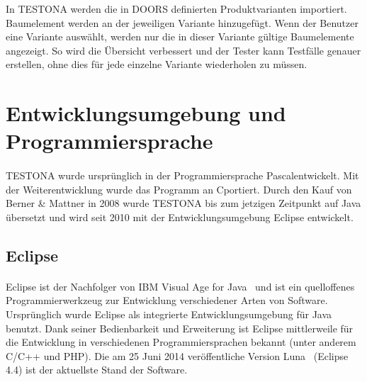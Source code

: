 In TESTONA werden  die in DOORS definierten Produktvarianten importiert. Baumelement werden an der jeweiligen Variante hinzugefügt. Wenn der Benutzer eine Variante auswählt, werden nur die in dieser Variante gültige Baumelemente angezeigt. So wird die Übersicht verbessert und der Tester kann Testfälle genauer erstellen, ohne dies für jede einzelne Variante wiederholen zu müssen.




\newpage
\section{Entwicklungsumgebung und Programmiersprache}
\paragraph{}
TESTONA wurde ursprünglich in der Programmiersprache \glqq Pascal\grqq entwickelt. Mit der Weiterentwicklung wurde das Programm an \glqq C\grqq portiert. Durch den Kauf von Berner \& Mattner in 2008 wurde TESTONA bis zum jetzigen Zeitpunkt auf Java übersetzt und wird seit 2010 mit der Entwicklungsumgebung Eclipse entwickelt.


\subsection{Eclipse}
\paragraph{}
Eclipse ist der Nachfolger von \glqq IBM Visual Age for Java\grqq~ und ist ein quelloffenes Programmierwerkzeug zur Entwicklung verschiedener Arten von Software. Ursprünglich wurde Eclipse als integrierte Entwicklungsumgebung für Java benutzt. Dank seiner Bedienbarkeit und Erweiterung ist Eclipse mittlerweile für die Entwicklung in verschiedenen Programmiersprachen bekannt (unter anderem C/C++ und PHP). Die am 25 Juni 2014 veröffentliche Version \glqq Luna\grqq~ (Eclipse 4.4) ist der aktuellste Stand der Software. \\

